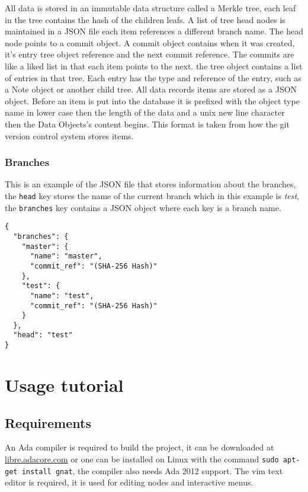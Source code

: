 \documentclass[12pt,a4paper]{article}
\newcommand{\codetext}[1]{\colorbox{light-gray}{\texttt{#1}}}
\begin{document}
\par All data is stored in an immutable data structure called a Merkle tree,
each leaf in the tree contains the hash of the children leafs. A list of tree
head nodes is maintained in a JSON file each item references a different branch
name. The head node points to a commit object. A commit object contains when it
was created, it's entry tree object reference and the next commit reference. The
commits are like a liked list in that each item points to the next. the tree
object contains a list of entries in that tree. Each entry has the type and
reference of the entry, such as a Note object or another child tree. All data
records items are stored as a JSON object. Before an item is put into the
database it is prefixed with the object type name in lower case then the length
of the data and a unix new line character then the Data Objects's content
begins. This format is taken from how the git version control system stores
items.

\subsubsection{Branches}
This is an example of the JSON file that stores information about the branches,
the \codetext{head} key stores the name of the current branch which in this
example is \textit{test}, the \codetext{branches} key contains a JSON object
where each key is a branch name.

\begin{verbatim}
{
  "branches": {
    "master": {
      "name": "master",
      "commit_ref": "(SHA-256 Hash)"
    },
    "test": {
      "name": "test",
      "commit_ref": "(SHA-256 Hash)"
    }
  },
  "head": "test"
}
\end{verbatim}



\section{Usage tutorial}
\subsection{Requirements}
An Ada compiler is required to build the project, it can be downloaded at
\href{http://libre.adacore.com/}{libre.adacore.com} or one can be installed on
Linux with the command \codetext{sudo apt-get install gnat}, the compiler also
needs Ada 2012 support. The vim text editor is required, it is used for editing
nodes and interactive menus.
\end{document}

